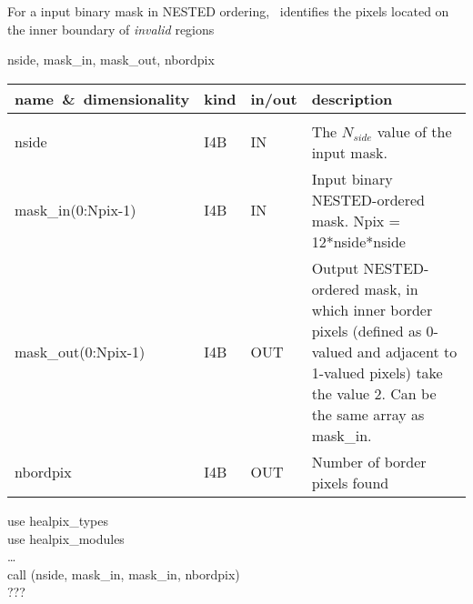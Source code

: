 \sloppy
{}\section[maskborder\_nest]{ }
\label{sub:maskborder_nest}
\author{Eric Hivon}

\begin{facility}
{For a input binary mask in NESTED ordering, \thedocid\ identifies the pixels
located on the inner boundary of {\em invalid} regions
}
{\modMaskTools}
\end{facility}

\begin{f90format}
{nside, mask\_in, mask\_out, nbordpix}
\end{f90format}

\begin{arguments}
{
\begin{tabular}{p{0.35\hsize} p{0.05\hsize} p{0.1\hsize} p{0.40\hsize}} \hline  
\textbf{name~\&~dimensionality} & \textbf{kind} & \textbf{in/out} & \textbf{description} \\ \hline
                   &   &   &                           \\ %
nside & I4B & IN & The $N_{side}$ value of the input mask. \\
mask\_in(0:Npix-1) & I4B & IN & Input binary NESTED-ordered mask. Npix = 12*nside*nside\\
mask\_out(0:Npix-1) &I4B & OUT & Output NESTED-ordered mask, in which inner border
pixels (defined as 0-valued and adjacent to 1-valued pixels) take the value 2. Can be the same
array as mask\_in.\\
nbordpix & I4B & OUT & Number of border pixels found
\end{tabular}
}
\end{arguments}

\begin{example}
{
use healpix\_types \\
use healpix\_modules \\
\ldots \\
call \thedocid(nside, mask\_in, mask\_in, nbordpix)  \\
}
{???
}
\end{example}

